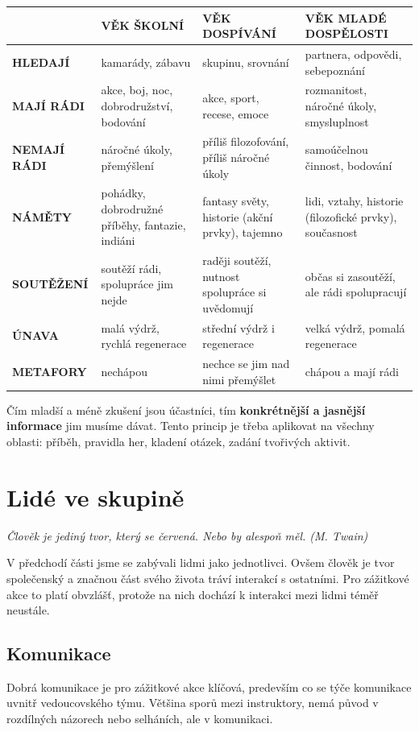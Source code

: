 \documentclass[a4paper,12pt]{report}
\begin{document}
\begin{center}
\renewcommand{\arraystretch}{1.3}
\begin{tabular}{ | m{2cm} || m{4.2cm}| m{4.2cm} | m{4.2cm} | } 
  \hline
  & \vspace{.3cm} \textbf{VĚK ŠKOLNÍ} & \vspace{.3cm} \textbf{VĚK DOSPÍVÁNÍ} & \vspace{.3cm} \textbf{VĚK MLADÉ DOSPĚLOSTI}\tabularnewline [12pt]
  \hline
  \textbf{HLEDAJÍ} & kamarády, zábavu & skupinu, srovnání & partnera, odpovědi, sebepoznání\tabularnewline
  \hline
  \textbf{MAJÍ RÁDI} & akce, boj, noc, dobrodružství, bodování & akce, sport, recese, emoce & rozmanitost, náročné úkoly, smysluplnost \tabularnewline
  \hline
  \textbf{NEMAJÍ RÁDI} & náročné úkoly, přemýšlení & příliš filozofování, příliš náročné úkoly & samoúčelnou činnost, bodování \tabularnewline
  \hline
  \textbf{NÁMĚTY} & pohádky, dobrodružné příběhy, fantazie, indiáni & fantasy světy, historie (akční prvky), tajemno & lidi, vztahy, historie (filozofické prvky), současnost \tabularnewline
  \hline
  \textbf{SOUTĚŽENÍ} & soutěží rádi, spolupráce jim nejde & raději soutěží, nutnost spolupráce si uvědomují & občas si zasoutěží, ale rádi spolupracují \tabularnewline
  \hline
  \textbf{ÚNAVA} & malá výdrž, rychlá regenerace & střední výdrž i regenerace & velká výdrž, pomalá regenerace \tabularnewline
  \hline
  \textbf{METAFORY} & nechápou & nechce se jim nad nimi přemýšlet & chápou a mají rádi \tabularnewline
  \hline
\end{tabular}
\end{center}
\pagelogos

Čím mladší a méně zkušení jsou účastníci, tím \textbf{konkrétnější a jasnější informace} jim musíme dávat. Tento princip je třeba aplikovat na všechny oblasti: příběh, pravidla her, kladení otázek, zadání tvořivých aktivit.


\section[Lidé ve skupině]{Lidé ve skupině}
\pagelogos
\textit{Člověk je jediný tvor, který se červená. Nebo by alespoň měl. (M. Twain)}

V předchodí části jsme se zabývali lidmi jako jednotlivci. Ovšem člověk je tvor společenský a značnou část svého života tráví interakcí s ostatními. Pro zážitkové akce to platí obvzlášť, protože na nich dochází k interakci mezi lidmi téměř neustále.

\subsection*{Komunikace}
Dobrá komunikace je pro zážitkové akce klíčová, predevším co se týče komunikace uvnitř vedoucovského týmu. Většina sporů mezi instruktory, nemá původ v rozdílných názorech nebo selháních, ale v komunikaci.
\end{document}
